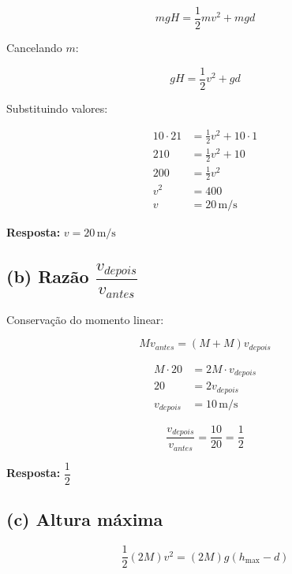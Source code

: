 \documentclass[a4paper,12pt]{article}
\begin{document}
\begin{equation}
mgH = \frac{1}{2}mv^2 + mgd
\end{equation}

Cancelando $m$:

\begin{equation}
gH = \frac{1}{2}v^2 + gd
\end{equation}

Substituindo valores:

\begin{align}
10 \cdot 21 &= \frac{1}{2}v^2 + 10 \cdot 1 \\
210 &= \frac{1}{2}v^2 + 10 \\
200 &= \frac{1}{2}v^2 \\
v^2 &= 400 \\
v &= 20 \, \text{m/s}
\end{align}

\textbf{Resposta:} $v = 20 \, \text{m/s}$

\vspace{0.5cm}

\subsection*{(b) Razão $\dfrac{v_{depois}}{v_{antes}}$}

Conservação do momento linear:

\begin{equation}
M v_{antes} = (M + M)v_{depois}
\end{equation}

\begin{align}
M \cdot 20 &= 2M \cdot v_{depois} \\
20 &= 2v_{depois} \\
v_{depois} &= 10 \, \text{m/s}
\end{align}

\begin{equation}
\frac{v_{depois}}{v_{antes}} = \frac{10}{20} = \frac{1}{2}
\end{equation}

\textbf{Resposta:} $\dfrac{1}{2}$

\vspace{0.5cm}

\subsection*{(c) Altura máxima}

\begin{equation}
\frac{1}{2}(2M)v^2 = (2M)g(h_{\max} - d)
\end{equation}
\end{document}
